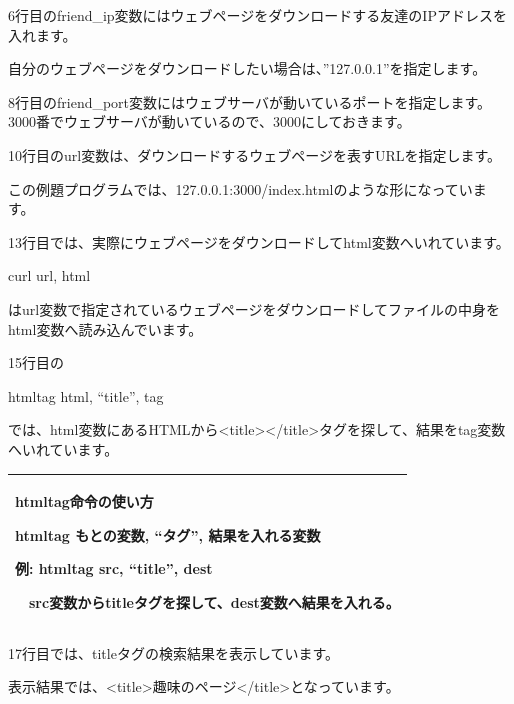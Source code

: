 \documentclass[a4paper,12pt,dvipdfmx]{jarticle}
\begin{document}
\bigskip



\bigskip

6行目のfriend\_ip変数にはウェブページをダウンロードする友達のIPアドレスを入れます。

自分のウェブページをダウンロードしたい場合は、”127.0.0.1”を指定します。


\bigskip

8行目のfriend\_port変数にはウェブサーバが動いているポートを指定します。
3000番でウェブサーバが動いているので、3000にしておきます。


\bigskip

10行目のurl変数は、ダウンロードするウェブページを表すURLを指定します。

この例題プログラムでは、127.0.0.1:3000/index.htmlのような形になっています。


\bigskip

13行目では、実際にウェブページをダウンロードしてhtml変数へいれています。

curl url, html

はurl変数で指定されているウェブページをダウンロードしてファイルの中身をhtml変数へ読み込んでいます。


\bigskip

\clearpage
15行目の

htmltag html, “title”, tag

では、html変数にあるHTMLから{\textless}title{\textgreater}{\textless}/title{\textgreater}タグを探して、結果をtag変数へいれています。


\bigskip

\begin{center}
\tablefirsthead{}
\tablehead{}
\tabletail{}
\tablelasttail{}
\begin{supertabular}{|m{16.806cm}|}
\hline
htmltag命令の使い方

\textbf{htmltag} \textbf{もとの変数, “タグ”,
結果を入れる変数}

例: htmltag src, “title”, dest

　src変数からtitleタグを探して、dest変数へ結果を入れる。\\\hline
\end{supertabular}
\end{center}

\bigskip

17行目では、titleタグの検索結果を表示しています。

表示結果では、{\textless}title{\textgreater}趣味のページ{\textless}/title{\textgreater}となっています。
\end{document}
